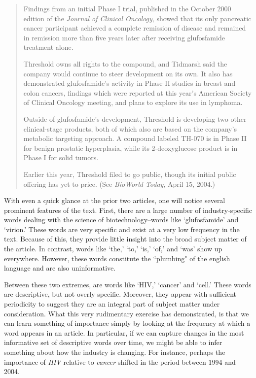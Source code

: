 \begin{singlespace}
\begin{small}
\begin{quotation}
Findings from an initial Phase I trial, published in the October 2000 edition of the \emph{Journal of Clinical Oncology}, showed that its only pancreatic cancer participant achieved a complete remission of disease and remained in remission more than five years later after receiving glufosfamide treatment alone.

Threshold owns all rights to the compound, and Tidmarsh said the company would continue to steer development on its own. It also has demonstrated glufosfamide's activity in Phase II studies in breast and colon cancers, findings which were reported at this year's American Society of Clinical Oncology meeting, and plans to explore its use in lymphoma.

Outside of glufosfamide's development, Threshold is developing two other clinical-stage products, both of which also are based on the company's metabolic targeting approach. A compound labeled TH-070 is in Phase II for benign prostatic hyperplasia, while its 2-deoxyglucose product is in Phase I for solid tumors.

Earlier this year, Threshold filed to go public, though its initial public offering has yet to price. (See \emph{BioWorld Today}, April 15, 2004.) 
\end{quotation}
\end{small}
\end{singlespace}

With even a quick glance at the prior two articles, one will notice several prominent features of the text. First, there are a large number of industry-specific words dealing with the science of biotechnology--words like `glufosfamide' and `virion.' These words are very specific and exist at a very low frequency in the text. Because of this, they provide little insight into the broad subject matter of the article. In contrast, words like `the,' `to,' `is,' `of,' and `was' show up everywhere. However, these words constitute the ``plumbing" of the english language and are also uninformative.

Between these two extremes, are words like `HIV,' `cancer' and `cell.' These words are descriptive, but not overly specific. Moreover, they appear with sufficient periodicity to suggest they are an integral part of subject matter under consideration. What this very rudimentary exercise has demonstrated, is that we can learn something of importance simply by looking at the frequency at which a word appears in an article. In particular, if we can capture changes in the most informative set of descriptive words over time, we might be able to infer something about how the industry is changing. For instance, perhaps the importance of \emph{HIV} relative to \emph{cancer} shifted in the period between 1994 and 2004.

